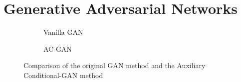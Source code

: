 \documentclass[%
 reprint,
 amsmath,amssymb,
 aps,
]{revtex4-2}
\begin{document}
\section{Generative Adversarial Networks}

\begin{comment}
\begin{itemize}
\item Describe GANs in detail but really focus on the fact that the reader is a
GW data analyst - not a computer scientist
\item A diagram would be very useful
\item Do not discuss our specific case here - just stay general
\item A subsection on the specific advanced flavour of GAN that you are using
here - motivate this choice.
\end{itemize}
\end{comment}

\begin{figure}
    \centering
    \begin{subfigure}[t]{0.45\columnwidth}
        \centering
        \caption{Vanilla GAN}
        \label{fig:GAN}
    \end{subfigure}\hfill
    \begin{subfigure}[t]{0.55\columnwidth}
        \centering
        \caption{AC-GAN}
        \label{fig:ACGAN}
    \end{subfigure}\hfill
    \caption{Comparison of the original GAN method and the Auxiliary Conditional-GAN method }
\end{figure}
\end{document}
